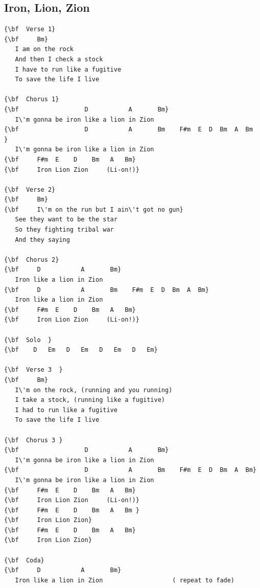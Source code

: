 \documentclass[a4paper]{article}
\begin{document}
\subsection{Iron, Lion, Zion}
\begin{Verbatim}[commandchars=\\\{\}]
{\bf  Verse 1}
{\bf     Bm}
   I am on the rock
   And then I check a stock
   I have to run like a fugitive
   To save the life I live

{\bf  Chorus 1}
{\bf                  D           A       Bm}
   I\'m gonna be iron like a lion in Zion
{\bf                  D           A       Bm    F#m  E  D  Bm  A  Bm   }
   I\'m gonna be iron like a lion in Zion
{\bf     F#m  E    D    Bm   A   Bm}
{\bf     Iron Lion Zion     (Li-on!)}

{\bf  Verse 2}
{\bf     Bm}
{\bf     I\'m on the run but I ain\'t got no gun}
   See they want to be the star
   So they fighting tribal war
   And they saying

{\bf  Chorus 2}
{\bf     D           A       Bm}
   Iron like a lion in Zion
{\bf     D           A       Bm    F#m  E  D  Bm  A  Bm}
   Iron like a lion in Zion
{\bf     F#m  E    D    Bm   A   Bm}
{\bf     Iron Lion Zion     (Li-on!)}

{\bf  Solo  }
{\bf    D   Em   D   Em   D   Em   D   Em}

{\bf  Verse 3  }
{\bf     Bm}
   I\'m on the rock, (running and you running)
   I take a stock, (running like a fugitive)
   I had to run like a fugitive
   To save the life I live

{\bf  Chorus 3 }
{\bf                  D           A       Bm}
   I\'m gonna be iron like a lion in Zion
{\bf                  D           A       Bm    F#m  E  D  Bm  A  Bm}
   I\'m gonna be iron like a lion in Zion
{\bf     F#m  E    D    Bm   A   Bm}
{\bf     Iron Lion Zion     (Li-on!)}
{\bf     F#m  E    D    Bm   A   Bm }
{\bf     Iron Lion Zion}
{\bf     F#m  E    D    Bm   A   Bm}
{\bf     Iron Lion Zion}

{\bf  Coda}
{\bf     D           A       Bm}
   Iron like a lion in Zion                   ( repeat to fade)

\end{Verbatim}
\newpage
\end{document}
